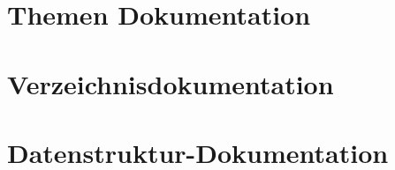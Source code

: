 \documentclass[twoside]{book}
\newcommand{\+}{\discretionary{\mbox{\scriptsize$\hookleftarrow$}}{}{}}
\begin{document}
\chapter{Themen Dokumentation}











































\chapter{Verzeichnisdokumentation}



\chapter{Datenstruktur-\/\+Dokumentation}


\end{document}
